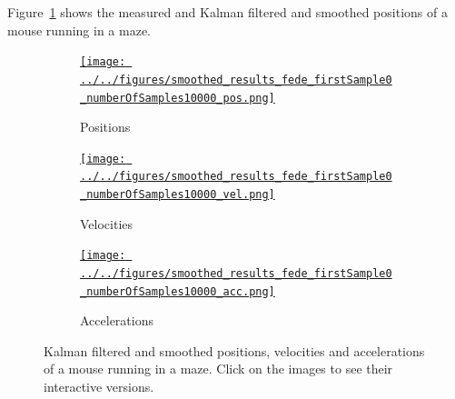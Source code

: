 \documentclass[12pt]{article}
\begin{document}
Figure~\ref{fig:runningMaze} shows the measured and Kalman filtered and smoothed
positions of a mouse running in a maze.

\begin{figure}
    \begin{center}

        \begin{subfigure}{\textwidth}
            \centering
            \href{http://www.gatsby.ucl.ac.uk/~rapela/fwg/lds_repo/inference/figures/smoothed_results_fede_firstSample0_numberOfSamples10000_pos.html}{\texttt{[image: ../../figures/smoothed\_results\_fede\_firstSample0\_numberOfSamples10000\_pos.png]}}
            \caption{Positions}
        \end{subfigure}

        \begin{subfigure}{\textwidth}
            \centering
            \href{http://www.gatsby.ucl.ac.uk/~rapela/fwg/lds_repo/inference/figures/smoothed_results_fede_firstSample0_numberOfSamples10000_vel.html}{\texttt{[image: ../../figures/smoothed\_results\_fede\_firstSample0\_numberOfSamples10000\_vel.png]}}
            \caption{Velocities}
        \end{subfigure}

        \begin{subfigure}{\textwidth}
            \centering
            \href{http://www.gatsby.ucl.ac.uk/~rapela/fwg/lds_repo/inference/figures/smoothed_results_fede_firstSample0_numberOfSamples10000_acc.html}{\texttt{[image: ../../figures/smoothed\_results\_fede\_firstSample0\_numberOfSamples10000\_acc.png]}}
            \caption{Accelerations}
        \end{subfigure}


        \caption{Kalman filtered and smoothed positions, velocities and
        accelerations of a mouse running in a maze. Click on the images to see
        their interactive versions.}

        \label{fig:runningMaze}

    \end{center}
\end{figure}



\end{document}
